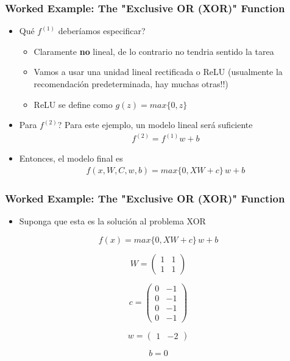 \documentclass[
  shownotes,
  xcolor={svgnames},
  hyperref={colorlinks,citecolor=DarkBlue,linkcolor=DarkRed,urlcolor=DarkBlue}
  , aspectratio=169]{beamer}
\begin{document}
\begin{frame}
\frametitle{Worked Example: The "Exclusive OR (XOR)" Function}

\begin{itemize}
    \item Qué $f^{(1)}$ deberíamos especificar?
    \medskip
    \begin{itemize}
    \item Claramente {\bf no} lineal, de lo contrario no tendria sentido la tarea
    \item Vamos a usar una unidad lineal rectificada o ReLU (usualmente la recomendación predeterminada, hay muchas otras!!)
    \item ReLU se define como $g(z)=max\{0,z\}$
    \end{itemize}
    
    \item Para $f^{(2)}$? Para este ejemplo, un modelo lineal será suficiente
    \medskip
    \begin{align}
    f^{(2)} = f^{(1)}w + b
    \end{align}
    \item Entonces, el modelo final es  
    \begin{align}
    f(x,W,C,w,b) = max\{0,XW+c\}\,w + b
    \end{align}
\end{itemize}

\end{frame}
\begin{frame}
\frametitle{Worked Example: The "Exclusive OR (XOR)" Function}

\begin{itemize}
\item Suponga que esta es la solución al problema XOR  
\end{itemize}


\[
f(x)=max\{0,XW+c\}\,w+b
\]

\[
W=\left(\begin{array}{cc}
1 & 1\\
1 & 1
\end{array}\right)
\]

\[
c=\left(\begin{array}{cc}
0 & -1\\
0 & -1\\
0 & -1\\
0 & -1
\end{array}\right)
\]

\[
w=\left(\begin{array}{cc}
1 & -2\end{array}\right)
\]

 \[
 b = 0
 \]


\end{frame}
\end{document}
